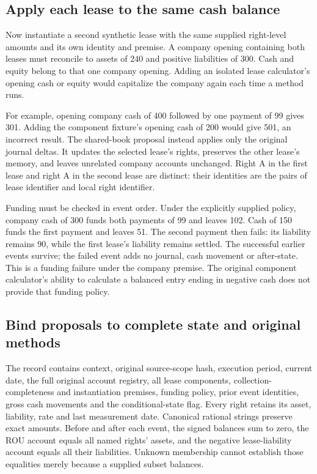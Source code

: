 \subsection{Apply each lease to the same cash balance}

Now instantiate a second synthetic lease with the same supplied right-level
amounts and its own identity and premise. A company opening containing both
leases must reconcile to assets of 240 and positive liabilities of 300. Cash
and equity belong to that one company opening. Adding an isolated lease
calculator's opening cash or equity would capitalize the company again each
time a method runs.

For example, opening company cash of 400 followed by one payment of 99 gives
301. Adding the component fixture's opening cash of 200 would give 501, an
incorrect result. The shared-book proposal instead applies only the original
journal deltas. It updates the selected lease's rights, preserves the other
lease's memory, and leaves unrelated company accounts unchanged. Right A in
the first lease and right A in the second lease are distinct: their identities
are the pairs of lease identifier and local right identifier.

Funding must be checked in event order. Under the explicitly supplied
 policy, company cash of 300 funds both payments of 99 and
leaves 102. Cash of 150 funds the first payment and leaves 51. The second
payment then fails: its liability remains 90, while the first lease's liability
remains settled. The successful earlier events survive; the failed event adds
no journal, cash movement or after-state. This is a funding failure under the
company premise. The original component calculator's ability to calculate a
balanced entry ending in negative cash does not provide that funding policy.

\subsection{Bind proposals to complete state and original methods}

The  record contains context, original source-scope
hash, execution period, current date, the full original account registry, all
lease components, collection-completeness and instantiation premises, funding
policy, prior event identities, gross cash movements and the conditional-state
flag. Every right retains its asset, liability, rate and last measurement date.
Canonical rational strings preserve exact amounts. Before and after each event,
the signed balances sum to zero, the ROU account equals all named rights'
assets, and the negative lease-liability account equals all their liabilities.
Unknown membership cannot establish those equalities merely because a supplied
subset balances.

